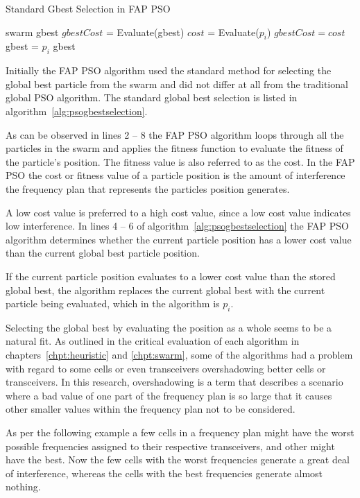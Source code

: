 \begin{algorithm}
\caption{Standard Gbest Selection in FAP PSO }
\label{alg:psogbestselection}
\begin{algorithmic}[1]
\Require swarm
\Require gbest
\State $gbestCost$ = Evaluate(gbest)
	\State $cost$ = Evaluate($p_i$)
		\State $gbestCost = cost$
		\State gbest = $p_i$
	\EndIf
\EndFor
\Return gbest
\end{algorithmic}
\end{algorithm}

Initially the \gls{FAP} \gls{PSO} algorithm used the standard method for selecting the global best particle from the swarm and did not differ at all from the traditional global \gls{PSO} algorithm. The standard global best selection is listed in algorithm~\ref{alg:psogbestselection}. 

As can be observed in lines 2 -- 8 the \gls{FAP} \gls{PSO} algorithm loops through all the particles in the swarm and applies the fitness function to evaluate the fitness of the particle's position. The fitness value is also referred to as the cost. In the \gls{FAP} \gls{PSO} the cost or fitness value of a particle position is the amount of interference the frequency plan that represents the particles position generates.

A low cost value is preferred to a high cost value, since a low cost value indicates low interference. In lines 4 -- 6 of algorithm~\ref{alg:psogbestselection} the \gls{FAP} \gls{PSO} algorithm determines whether the current particle position has a lower cost value than the current global best particle position.

If the current particle position evaluates to a lower cost value than the stored global best, the algorithm replaces the current global best with the current particle being evaluated, which in the algorithm is $p_i$.

Selecting the global best by evaluating the position as a whole seems to be a natural fit. As outlined in the critical evaluation of each algorithm in chapters~\ref{chpt:heuristic} and \ref{chpt:swarm}, some of the algorithms had a problem with regard to some cells or even transceivers overshadowing better cells or transceivers. In this research, overshadowing is a term that describes a scenario where a bad value of one part of the frequency plan is so large that it causes other smaller values within the frequency plan not to be considered. 

As per the following example a few cells in a frequency plan might have the worst possible frequencies assigned to their respective transceivers, and other might have the best. Now the few cells with the worst frequencies generate a great deal of interference, whereas the cells with the best frequencies generate almost nothing.

